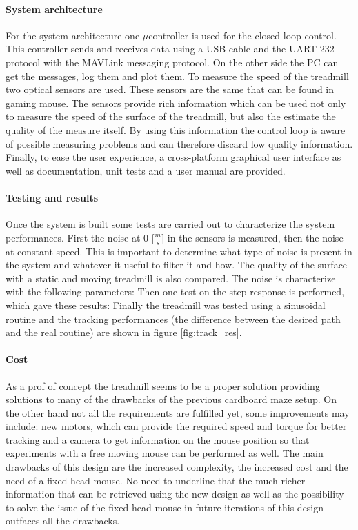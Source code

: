 \documentclass[12pt,a4paper]{article}
\begin{document}
\begin{multicols}{2}
\paragraph{System architecture}
 For the system architecture one $\mu$controller is used for the closed-loop control. This controller sends and receives data using a USB cable and the UART 232 protocol with the MAVLink messaging protocol. On the other side the PC can get the messages, log them and plot them. To measure the speed of the treadmill two optical sensors are used. These sensors are the same that can be found in gaming mouse. The sensors provide rich information which can be used not only to measure the speed of the surface of the treadmill, but also the estimate the quality of the measure itself. By using this information the control loop is aware of possible measuring problems and can therefore discard low quality information.\\
 Finally, to ease the user experience, a cross-platform graphical user interface as well as documentation, unit tests and a user manual are provided. 
 
\paragraph{Testing and results}
Once the system is built some tests are carried out to characterize the system performances.
First the noise at 0 [$\frac{m}{s}$] in the sensors is measured, then the noise at constant speed. This is important to determine what type of noise is present in the system and whatever it useful to filter it and how. The quality of the surface with a static and moving treadmill is also compared. The noise is characterize with the following parameters: 
Then one test on the step response is performed, which gave these results: 
Finally the treadmill was tested using a sinusoidal routine and the tracking performances (the difference between the desired path and the real routine) are shown in figure \ref{fig:track_res}.

\paragraph{Cost}
As a prof of concept the treadmill seems to be a proper solution providing solutions to many of the drawbacks of the previous cardboard maze setup. On the other hand not all the requirements are fulfilled yet, some improvements may include: new motors, which can provide the required speed and torque for better tracking and a camera to get information on the mouse position so that experiments with a free moving mouse can be performed as well. The main drawbacks of this design are the increased complexity, the increased cost and the need of a fixed-head mouse. No need to underline that the much richer information that can be retrieved using the new design as well as the possibility to solve the issue of the fixed-head mouse in future iterations of this design outfaces all the drawbacks.  



\end{multicols}
\end{document}
